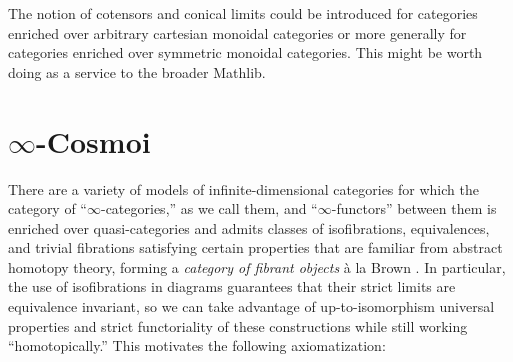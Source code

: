 \begin{rmk}
  The notion of cotensors and conical limits could be introduced for categories enriched over arbitrary cartesian monoidal categories or more generally for categories enriched over symmetric monoidal categories. This might be worth doing as a service to the broader Mathlib.
\end{rmk}

\section{\texorpdfstring{$\infty$}{Infinity}-Cosmoi}\label{sec:cosmos}

There are a variety of models of infinite-dimensional categories for which the category of ``$\infty$-categories,'' as we call them, and ``$\infty$-functors'' between them is enriched over quasi-categories and admits classes of isofibrations, equivalences, and trivial fibrations satisfying certain
properties that are familiar from abstract homotopy theory, forming a \emph{category of fibrant objects} \`{a} la Brown \cite{Brown:1973ah}. In particular, the use of isofibrations in diagrams guarantees that their strict limits are equivalence invariant, so we can take advantage of up-to-isomorphism universal properties and strict functoriality of these constructions while still working ``homotopically.'' This motivates the following axiomatization:


